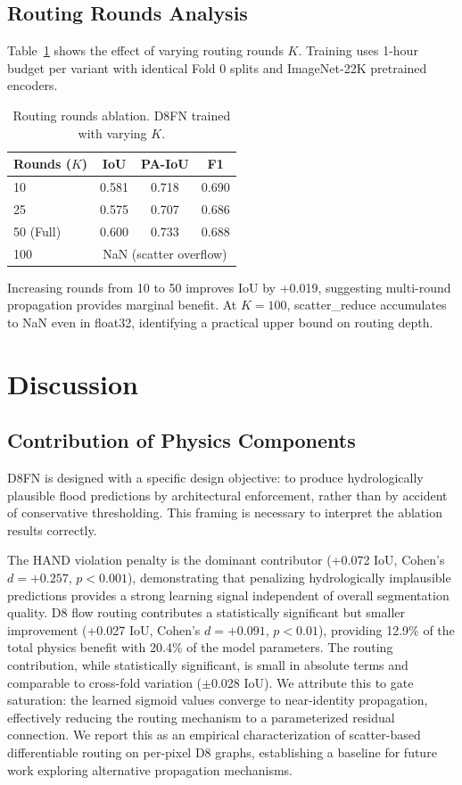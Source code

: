 \documentclass[journal]{IEEEtran}
\begin{document}
\subsection{Routing Rounds Analysis}
Table~\ref{tab:rounds} shows the effect of varying routing rounds $K$. Training uses 1-hour budget per variant with identical Fold 0 splits and ImageNet-22K pretrained encoders.

\begin{table}[t]
\centering
\caption{Routing rounds ablation. D8FN trained with varying $K$.}
\label{tab:rounds}
\small
\begin{tabular}{lccc}
\toprule
Rounds ($K$) & IoU & PA-IoU & F1 \\
\midrule
10 & 0.581 & 0.718 & 0.690 \\
25 & 0.575 & 0.707 & 0.686 \\
50 (Full) & 0.600 & 0.733 & 0.688 \\
100 & \multicolumn{3}{c}{NaN (scatter overflow)} \\
\bottomrule
\end{tabular}
\end{table}

Increasing rounds from 10 to 50 improves IoU by +0.019, suggesting multi-round propagation provides marginal benefit. At $K=100$, scatter\_reduce accumulates to NaN even in float32, identifying a practical upper bound on routing depth.

\section{Discussion}

\subsection{Contribution of Physics Components}
D8FN is designed with a specific design objective: to produce hydrologically plausible flood predictions by architectural enforcement, rather than by accident of conservative thresholding. This framing is necessary to interpret the ablation results correctly.

The HAND violation penalty is the dominant contributor (+0.072 IoU, Cohen's $d=+0.257$, $p<0.001$), demonstrating that penalizing hydrologically implausible predictions provides a strong learning signal independent of overall segmentation quality. D8 flow routing contributes a statistically significant but smaller improvement (+0.027 IoU, Cohen's $d=+0.091$, $p<0.01$), providing 12.9\% of the total physics benefit with 20.4\% of the model parameters. The routing contribution, while statistically significant, is small in absolute terms and comparable to cross-fold variation ($\pm$0.028 IoU). We attribute this to gate saturation: the learned sigmoid values converge to near-identity propagation, effectively reducing the routing mechanism to a parameterized residual connection. We report this as an empirical characterization of scatter-based differentiable routing on per-pixel D8 graphs, establishing a baseline for future work exploring alternative propagation mechanisms.
\end{document}
